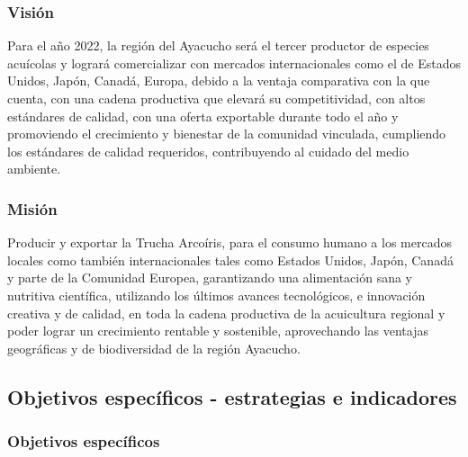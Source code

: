 \documentclass[
  stu,
  floatsintext,
  longtable,
  a4paper,
  nolmodern,
  notxfonts,
  notimes,
  colorlinks=true,linkcolor=blue,citecolor=blue,urlcolor=blue]{apa7}
\begin{document}
\subsubsection{Visión}\label{visiuxf3n}

Para el año 2022, la región del Ayacucho será el tercer productor de
especies acuícolas y logrará comercializar con mercados internacionales
como el de Estados Unidos, Japón, Canadá, Europa, debido a la ventaja
comparativa con la que cuenta, con una cadena productiva que elevará su
competitividad, con altos estándares de calidad, con una oferta
exportable durante todo el año y promoviendo el crecimiento y bienestar
de la comunidad vinculada, cumpliendo los estándares de calidad
requeridos, contribuyendo al cuidado del medio ambiente.

\subsubsection{Misión}\label{misiuxf3n}

Producir y exportar la Trucha Arcoíris, para el consumo humano a los
mercados locales como también internacionales tales como Estados Unidos,
Japón, Canadá y parte de la Comunidad Europea, garantizando una
alimentación sana y nutritiva científica, utilizando los últimos avances
tecnológicos, e innovación creativa y de calidad, en toda la cadena
productiva de la acuicultura regional y poder lograr un crecimiento
rentable y sostenible, aprovechando las ventajas geográficas y de
biodiversidad de la región Ayacucho.

\subsection{Objetivos específicos - estrategias e
indicadores}\label{objetivos-especuxedficos---estrategias-e-indicadores}

\subsubsection{Objetivos específicos}\label{objetivos-especuxedficos}
\end{document}
